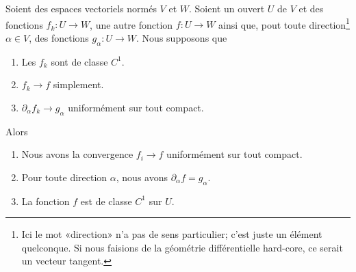 \begin{theorem}	\label{ThoSerUnifDerr}
    Soient des espaces vectoriels normés \( V\) et \( W\). Soient un ouvert \( U\) de \( V\) et des fonctions \( f_k\colon U\to W\), une autre fonction \( f\colon U\to W\) ainsi que, pout toute direction\footnote{Ici le mot «direction» n'a pas de sens particulier; c'est juste un élément quelconque. Si nous faisions de la géométrie différentielle hard-core, ce serait un vecteur tangent.} \( \alpha\in V\), des fonctions \( g_{\alpha}\colon U\to W\). Nous supposons que
    \begin{enumerate}
        \item
               Les \( f_k\) sont de classe \( C^1\).
           \item
               \( f_k\to f\) simplement.
           \item
               \( \partial_{\alpha}f_k\to g_{\alpha}\) uniformément sur tout compact.
    \end{enumerate}
    Alors
    \begin{enumerate}
        \item       \label{ITEMooQOSUooQGSUXC}
            Nous avons la convergence \( f_i\to f\) uniformément sur tout compact.
        \item        \label{ITEMooGFPLooGYEvkh}
           Pour toute direction \( \alpha\), nous avons \( \partial_{\alpha}f=g_{\alpha}\).
        \item
           La fonction \( f\) est de classe \( C^1\) sur \( U\).
    \end{enumerate}
\end{theorem}


